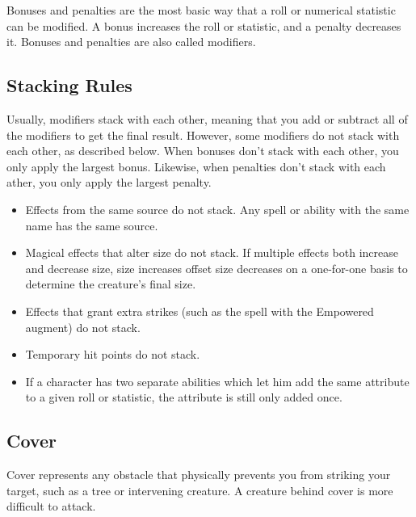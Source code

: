     Bonuses and penalties are the most basic way that a roll or numerical statistic can be modified. A bonus increases the roll or statistic, and a penalty decreases it. Bonuses and penalties are also called modifiers.

    \subsection{Stacking Rules}\label{Stacking Rules}
        Usually, modifiers stack with each other, meaning that you add or subtract all of the modifiers to get the final result. However, some modifiers do not stack with each other, as described below. When bonuses don't stack with each other, you only apply the largest bonus. Likewise, when penalties don't stack with each ather, you only apply the largest penalty.


        \begin{itemize}
            \item Effects from the same source do not stack. Any spell or ability with the same name has the same source.
            \item Magical effects that alter size do not stack. If multiple effects both increase and decrease size, size increases offset size decreases on a one-for-one basis to determine the creature's final size.
            \item Effects that grant extra strikes (such as the  spell with the Empowered augment) do not stack.
            \item Temporary hit points do not stack.
            \item If a character has two separate abilities which let him add the same attribute to a given roll or statistic, the attribute is still only added once.
        \end{itemize}

    \subsection{Cover}\label{Cover}

        Cover represents any obstacle that physically prevents you from striking your target, such as a tree or intervening creature. A creature behind cover is more difficult to attack.


